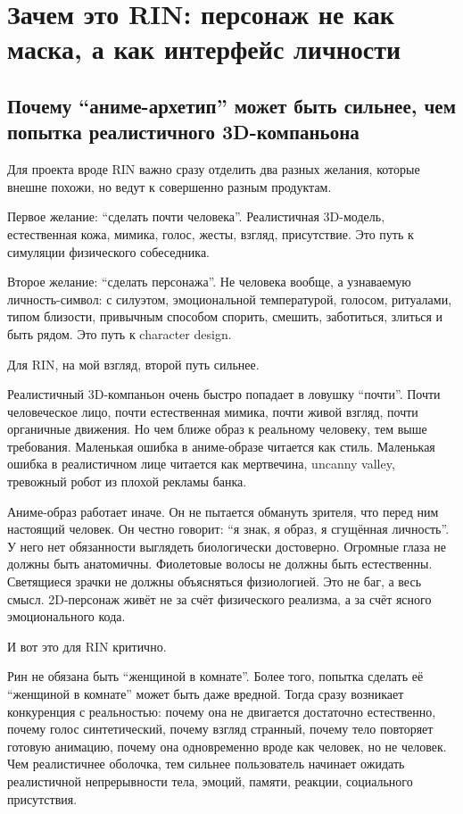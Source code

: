 \setcounter{chapter}{-1}
\chapter{Зачем это RIN: персонаж не как маска, а как интерфейс личности}

\setcounter{section}{0}
\section{Почему “аниме-архетип” может быть сильнее, чем попытка реалистичного 3D-компаньона}

Для проекта вроде RIN важно сразу отделить два разных желания, которые
внешне похожи, но ведут к совершенно разным продуктам.

Первое желание: ``сделать почти человека''. Реалистичная 3D-модель,
естественная кожа, мимика, голос, жесты, взгляд, присутствие. Это путь к
симуляции физического собеседника.

Второе желание: ``сделать персонажа''. Не человека вообще, а узнаваемую
личность-символ: с силуэтом, эмоциональной температурой, голосом,
ритуалами, типом близости, привычным способом спорить, смешить,
заботиться, злиться и быть рядом. Это путь к character design.

Для RIN, на мой взгляд, второй путь сильнее.

Реалистичный 3D-компаньон очень быстро попадает в ловушку ``почти''.
Почти человеческое лицо, почти естественная мимика, почти живой взгляд,
почти органичные движения. Но чем ближе образ к реальному человеку, тем
выше требования. Маленькая ошибка в аниме-образе читается как стиль.
Маленькая ошибка в реалистичном лице читается как мертвечина, uncanny
valley, тревожный робот из плохой рекламы банка.

Аниме-образ работает иначе. Он не пытается обмануть зрителя, что перед
ним настоящий человек. Он честно говорит: ``я знак, я образ, я сгущённая
личность''. У него нет обязанности выглядеть биологически достоверно.
Огромные глаза не должны быть анатомичны. Фиолетовые волосы не должны
быть естественны. Светящиеся зрачки не должны объясняться физиологией.
Это не баг, а весь смысл. 2D-персонаж живёт не за счёт физического
реализма, а за счёт ясного эмоционального кода.

И вот это для RIN критично.

Рин не обязана быть ``женщиной в комнате''. Более того, попытка сделать
её ``женщиной в комнате'' может быть даже вредной. Тогда сразу возникает
конкуренция с реальностью: почему она не двигается достаточно
естественно, почему голос синтетический, почему взгляд странный, почему
тело повторяет готовую анимацию, почему она одновременно вроде как
человек, но не человек. Чем реалистичнее оболочка, тем сильнее
пользователь начинает ожидать реалистичной непрерывности тела, эмоций,
памяти, реакции, социального присутствия.

